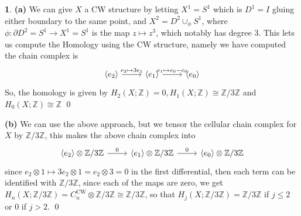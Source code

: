 \documentclass[10.5pt]{article}
\theoremstyle{definition}
\newtheorem{pb}{}
\newcommand{\gen}[1]{\langle#1\rangle}
\begin{document}
    \begin{pb}
        \textbf{(a)} We can give \(X\) a CW structure by letting \(X^1 = S^1\) which is \(D^1 = I\) gluing either boundary to the same point, and \(X^2 = D^2 \cup_{\phi} S^1\), where \(\phi: \partial D^2 = S^1 \to X^1 = S^1\) is the map \(z \mapsto z^3\), which notably has degree \(3\). This lets us compute the Homology using the CW structure, namely we have computed the chain complex is
        \begin{equation*}
            \begin{tikzcd}
                \gen{e_2} \arrow[r,"e_2 \mapsto 3e_1"] & \gen{e_1} \arrow[r,"e_1 \mapsto e_0 - e_0"] &\gen{e_0}
            \end{tikzcd}
        \end{equation*}
        So, the homology is given by \(H_2(X;\mathbb{Z}) = 0, H_1(X; \mathbb{Z}) \cong \mathbb{Z}/3 \mathbb{Z}\) and \(H_0(X;\mathbb{Z}) \cong \mathbb{Z}\) \qed

        \textbf{(b)} We can use the above approach, but we tensor the cellular chain complex for \(X\) by \(\mathbb{Z}/3 \mathbb{Z}\), this makes the above chain complex into
        \begin{equation*}
            \begin{tikzcd}
                \gen{e_2} \otimes \mathbb{Z}/3 \mathbb{Z} \arrow[r,"0"] & \gen{e_1} \otimes \mathbb{Z}/3 \mathbb{Z} \arrow[r,"0"] &\gen{e_0}\otimes \mathbb{Z}/3 \mathbb{Z}
            \end{tikzcd}
        \end{equation*}
        since \(e_2 \otimes 1 \mapsto 3 e_2 \otimes 1 = e_2 \otimes 3 = 0\) in the first differential, then each term can be identified with \(\mathbb{Z}/3 \mathbb{Z}\), since each of the maps are zero, we get \(H_n(X;\mathbb{Z}/3 \mathbb{Z}) = C_n^{\text{CW}} \otimes \mathbb{Z}/3 \mathbb{Z} \cong \mathbb{Z}/3 \mathbb{Z}\), so that \(H_j(X; \mathbb{Z}/ 3 \mathbb{Z}) = \mathbb{Z}/3 \mathbb{Z}\) if \(j \leq 2\) or \(0\) if \(j > 2\). \qed
    \end{pb}
    \newpage
\end{document}
